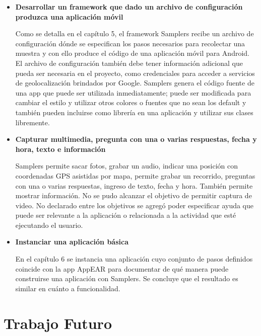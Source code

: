 \begin{itemize} 
  \item \textbf{Desarrollar un framework que dado un archivo de configuración produzca una aplicación móvil}
   
   Como se detalla en el capítulo 5, el framework Samplers recibe un archivo de configuración dónde se especifican los pasos necesarios para recolectar una muestra y con ello produce el código de una aplicación móvil para Android. El archivo de configuración también debe tener información adicional que pueda ser necesaria en el proyecto, como credenciales para acceder a servicios de geolocalización brindados por Google. Samplers genera el código fuente de una app que puede ser utilizada inmediatamente; puede ser modificada para cambiar el estilo y utilizar otros colores o fuentes que no sean los default y también pueden incluirse como librería en una aplicación y utilizar sus clases libremente.
   
   \item \textbf{Capturar multimedia, pregunta con una o varias respuestas, fecha y hora, texto e información}

Samplers permite sacar fotos, grabar un audio, indicar una posición con coordenadas GPS asistidas por mapa, permite grabar un recorrido, preguntas con una o varias respuestas, ingreso de texto, fecha y hora. También permite mostrar información. No se pudo alcanzar el objetivo de permitir captura de video. No declarado entre los objetivos se agregó poder especificar ayuda que puede ser relevante a la aplicación o relacionada a la actividad que esté ejecutando el usuario. 

   \item \textbf{Instanciar una aplicación básica}

En el capítulo 6 se instancia una aplicación cuyo conjunto de pasos definidos coincide con la app AppEAR para documentar de qué manera puede construirse una aplicación con Samplers. Se concluye que el resultado es similar en cuánto a funcionalidad.

\end{itemize} 

\section{Trabajo Futuro}

